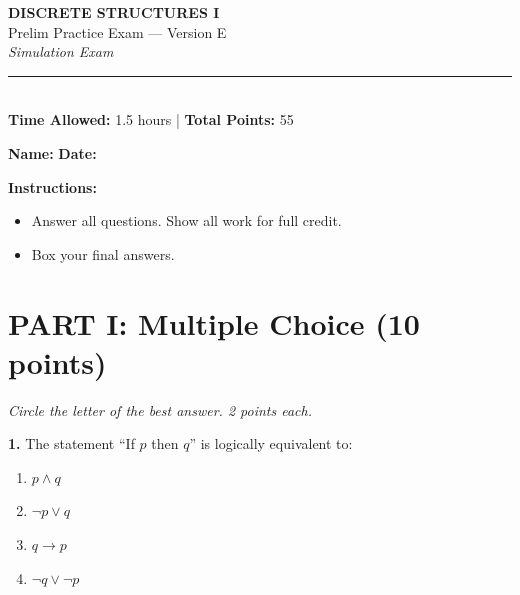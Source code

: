 \documentclass[11pt,a4paper]{article}
\begin{document}
\begin{center}
{\LARGE\textbf{DISCRETE STRUCTURES I}}\\[5pt]
{\Large Prelim Practice Exam --- Version E}\\[5pt]
{\large\textit{Simulation Exam}}\\[10pt]
\rule{0.8\textwidth}{0.5pt}\\[5pt]
\textbf{Time Allowed:} 1.5 hours \quad | \quad \textbf{Total Points:} 55
\end{center}

\vspace{5pt}

\noindent\textbf{Name:} \underline{\hspace{6cm}} \quad \textbf{Date:} \underline{\hspace{3cm}}

\vspace{10pt}

\noindent\textbf{Instructions:}
\begin{itemize}[noitemsep]
    \item Answer all questions. Show all work for full credit.
    \item Box your final answers.
\end{itemize}

\vspace{15pt}

\section*{PART I: Multiple Choice (10 points)}
\textit{Circle the letter of the best answer. 2 points each.}

\vspace{10pt}

\textbf{1.} The statement ``If $p$ then $q$'' is logically equivalent to:

\begin{enumerate}[label=(\Alph*),noitemsep]
    \item $p \land q$
    \item $\neg p \lor q$
    \item $q \to p$
    \item $\neg q \lor \neg p$
\end{enumerate}

\vspace{25pt}
\end{document}
